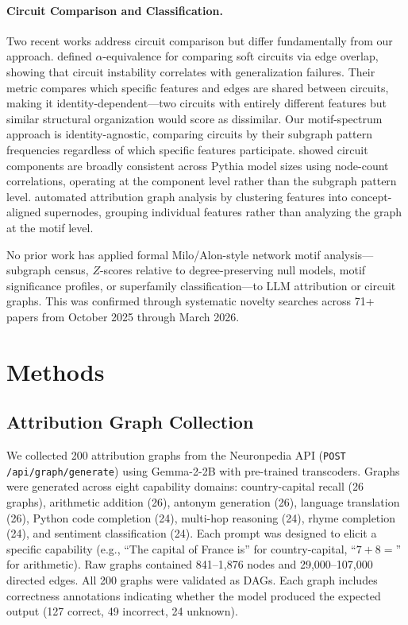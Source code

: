\documentclass[11pt,letterpaper]{article}
\begin{document}
\paragraph{Circuit Comparison and Classification.}
Two recent works address circuit comparison but differ fundamentally from our approach. \citet{Sun2025} defined $\alpha$-equivalence for comparing soft circuits via edge overlap, showing that circuit instability correlates with generalization failures. Their metric compares which specific features and edges are shared between circuits, making it identity-dependent---two circuits with entirely different features but similar structural organization would score as dissimilar. Our motif-spectrum approach is identity-agnostic, comparing circuits by their subgraph pattern frequencies regardless of which specific features participate. \citet{Tigges2024} showed circuit components are broadly consistent across Pythia model sizes using node-count correlations, operating at the component level rather than the subgraph pattern level. \citet{Birardi2025} automated attribution graph analysis by clustering features into concept-aligned supernodes, grouping individual features rather than analyzing the graph at the motif level.

No prior work has applied formal Milo/Alon-style network motif analysis---subgraph census, $Z$-scores relative to degree-preserving null models, motif significance profiles, or superfamily classification---to LLM attribution or circuit graphs. This was confirmed through systematic novelty searches across 71+ papers from October 2025 through March 2026.

\section{Methods}
\label{sec:methods}

\subsection{Attribution Graph Collection}

We collected 200 attribution graphs from the Neuronpedia API (\texttt{POST /api/graph/generate}) using Gemma-2-2B with pre-trained transcoders. Graphs were generated across eight capability domains: country-capital recall (26 graphs), arithmetic addition (26), antonym generation (26), language translation (26), Python code completion (24), multi-hop reasoning (24), rhyme completion (24), and sentiment classification (24). Each prompt was designed to elicit a specific capability (e.g., ``The capital of France is'' for country-capital, ``$7 + 8 =$'' for arithmetic). Raw graphs contained 841--1,876 nodes and 29,000--107,000 directed edges. All 200 graphs were validated as DAGs. Each graph includes correctness annotations indicating whether the model produced the expected output (127 correct, 49 incorrect, 24 unknown).
\end{document}
